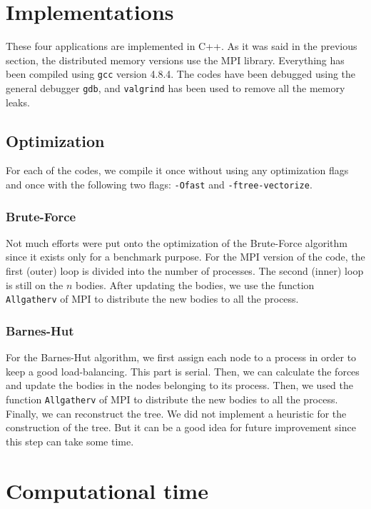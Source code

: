 \documentclass[10pt,a4paper]{article}
\begin{document}
\section{Implementations}

These four applications are implemented in C++. As it was said in the previous section, the distributed memory versions use the MPI library. Everything has been compiled using \verb+gcc+ version 4.8.4. The codes have been debugged using the general debugger \verb+gdb+, and \verb+valgrind+ has been used to remove all the memory leaks. 

\subsection{Optimization}

For each of the codes, we compile it once without using any optimization flags and once with the following two flags: \verb+-Ofast+ and \verb+-ftree-vectorize+.

\subsubsection{Brute-Force}

Not much efforts were put onto the optimization of the Brute-Force algorithm since it exists only for a benchmark purpose. For the MPI version of the code, the first (outer) loop is divided into the number of processes. The second (inner) loop is still on the $n$ bodies. After updating the bodies, we use the function \verb+Allgatherv+ of MPI to distribute the new bodies to all the process.

\subsubsection{Barnes-Hut}

For the Barnes-Hut algorithm, we first assign each node to a process in order to keep a good load-balancing. This part is serial. Then, we can calculate the forces and update the bodies in the nodes belonging to its process. Then, we used the function \verb+Allgatherv+ of MPI to distribute the new bodies to all the process. Finally, we can reconstruct the tree. We did not implement a heuristic for the construction of the tree. But it can be a good idea for future improvement since this step can take some time.

\section{Computational time}
\end{document}
